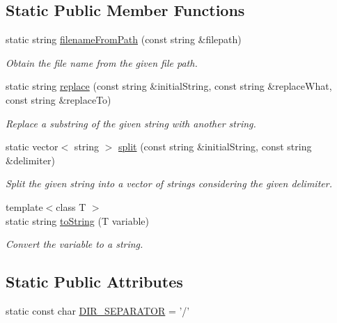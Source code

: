 \subsection*{Static Public Member Functions}
\begin{DoxyCompactItemize}
\item 
static string \hyperlink{classmultiscale_1_1StringManipulator_ab0354ab5ca48df4394695445fe105640}{filename\-From\-Path} (const string \&filepath)
\begin{DoxyCompactList}\small\item\em Obtain the file name from the given file path. \end{DoxyCompactList}\item 
static string \hyperlink{classmultiscale_1_1StringManipulator_afe65f4f4cdf70976df2a8749b9e2fc7b}{replace} (const string \&initial\-String, const string \&replace\-What, const string \&replace\-To)
\begin{DoxyCompactList}\small\item\em Replace a substring of the given string with another string. \end{DoxyCompactList}\item 
static vector$<$ string $>$ \hyperlink{classmultiscale_1_1StringManipulator_a899c72a05bbd8fb525f31bca3c1ec3c4}{split} (const string \&initial\-String, const string \&delimiter)
\begin{DoxyCompactList}\small\item\em Split the given string into a vector of strings considering the given delimiter. \end{DoxyCompactList}\item 
{\footnotesize template$<$class T $>$ }\\static string \hyperlink{classmultiscale_1_1StringManipulator_a91858c4faa5ee210a9b67e4885835368}{to\-String} (T variable)
\begin{DoxyCompactList}\small\item\em Convert the variable to a string. \end{DoxyCompactList}\end{DoxyCompactItemize}
\subsection*{Static Public Attributes}
\begin{DoxyCompactItemize}
\item 
static const char \hyperlink{classmultiscale_1_1StringManipulator_a3c975968005d8db010415d240b02b5db}{D\-I\-R\-\_\-\-S\-E\-P\-A\-R\-A\-T\-O\-R} = '/'
\end{DoxyCompactItemize}


